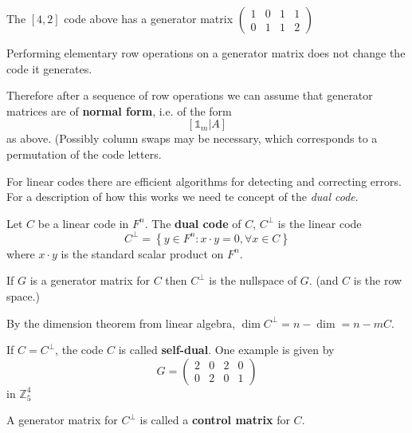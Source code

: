 \documentclass[english]{lbscript}
\begin{document}
\begin{example}{}{}
  The \([4,2]\) code above has a generator matrix \(\begin{pmatrix}
    1 & 0 & 1 & 1 \\
    0 & 1 & 1 & 2
  \end{pmatrix}\)
\end{example}
\begin{remark}{}{}
  Performing elementary row operations on a generator matrix does not change the code it generates.
\end{remark}
Therefore after a sequence of row operations we can assume that generator matrices are of \textbf{normal form}, i.e. of the form
\begin{equation}
  \label{eq:139}
  \left[𝟙_{m} | A\right]
\end{equation}
as above. (Possibly column swaps may be necessary, which corresponds to a permutation of the code letters.

For linear codes there are efficient algorithms for detecting and correcting errors. For a description of how this works we need te concept of the \emph{dual code}.

\begin{definition}{}{}
  Let \(C\) be a linear code in \(F^{n}\). The \textbf{dual code} of \(C\), \(C^{⟂}\) is the linear code
  \begin{equation}
    \label{eq:140}
    C^{⟂}=\left\{ y∈F^{n}: x⋅y=0, ∀x∈C \right\}
  \end{equation}
  where \(x⋅y\) is the standard scalar product on \(F^{n}\).
\end{definition}

\begin{remark}{}{}
  If \(G\) is a generator matrix for \(C\) then \(C^{⟂}\) is the nullspace of \(G\). (and \(C\) is the row space.)

  By the dimension theorem from linear algebra, \(\dim C^{⟂}=n-\dim =n-mC\).

  If \(C=C^{⟂}\), the code \(C\) is called \textbf{self-dual}. One example is given by
  \begin{equation}
    \label{eq:141}
    G=\begin{pmatrix}
      2 & 0 & 2 & 0 \\
      0 & 2 & 0 & 1
    \end{pmatrix}
  \end{equation} in \(ℤ_{5}^{4}\)
\end{remark}

\begin{definition}{}{}
  A generator matrix for \(C^{⟂}\) is called a \textbf{control matrix} for \(C\).
\end{definition}
\end{document}
